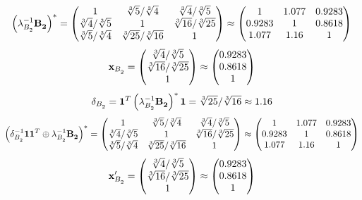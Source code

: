 \documentclass[10pt,a4paper]{article}
\begin{document}
	\[
		\left(\lambda_{B_2^{}}^{-1}\bold{B_2^{}}\right)^* = 
		\begin{pmatrix}
			{1}{} & {\sqrt[3]{5}} / {\sqrt[3]{4}} & {\sqrt[3]{4}} / {\sqrt[3]{5}} \\
			{\sqrt[3]{4}} / {\sqrt[3]{5}} & {1}{} & {\sqrt[3]{16}} / {\sqrt[3]{25}} \\
			{\sqrt[3]{5}} / {\sqrt[3]{4}} & {\sqrt[3]{25}} / {\sqrt[3]{16}} & {1}{} \\
		\end{pmatrix}
		\approx
		\begin{pmatrix}
			1        & 1.077    & 0.9283   \\
			0.9283   & 1        & 0.8618   \\
			1.077    & 1.16     & 1        \\
		\end{pmatrix}
	\]
	\[
		\bold{x}_{B_2^{}} = 
		\begin{pmatrix}
			{\sqrt[3]{4}} / {\sqrt[3]{5}} \\
			{\sqrt[3]{16}} / {\sqrt[3]{25}} \\
			{1}{} \\
		\end{pmatrix}
		\approx
		\begin{pmatrix}
			0.9283   \\
			0.8618   \\
			1        \\
		\end{pmatrix}
	\]
	\[
		\delta_{B_2^{}} = \bold{1}^T \left(\lambda_{B_2^{}}^{-1}\bold{B_2^{}}\right)^* \bold{1} = {\sqrt[3]{25}} / {\sqrt[3]{16}}\approx 1.16
	\]
	\[
		\left(\delta_{B_2^{}}^{-1}\bold{11}^T \oplus \lambda_{B_2^{}}^{-1}\bold{B_2^{}}\right)^* = 
		\begin{pmatrix}
			{1}{} & {\sqrt[3]{5}} / {\sqrt[3]{4}} & {\sqrt[3]{4}} / {\sqrt[3]{5}} \\
			{\sqrt[3]{4}} / {\sqrt[3]{5}} & {1}{} & {\sqrt[3]{16}} / {\sqrt[3]{25}} \\
			{\sqrt[3]{5}} / {\sqrt[3]{4}} & {\sqrt[3]{25}} / {\sqrt[3]{16}} & {1}{} \\
		\end{pmatrix}
		\approx
		\begin{pmatrix}
			1        & 1.077    & 0.9283   \\
			0.9283   & 1        & 0.8618   \\
			1.077    & 1.16     & 1        \\
		\end{pmatrix}
	\]
	\[
		\bold{x}'_{B_2^{}} = 
		\begin{pmatrix}
			{\sqrt[3]{4}} / {\sqrt[3]{5}} \\
			{\sqrt[3]{16}} / {\sqrt[3]{25}} \\
			{1}{} \\
		\end{pmatrix}
		\approx
		\begin{pmatrix}
			0.9283   \\
			0.8618   \\
			1        \\
		\end{pmatrix}
	\]
\end{document}
